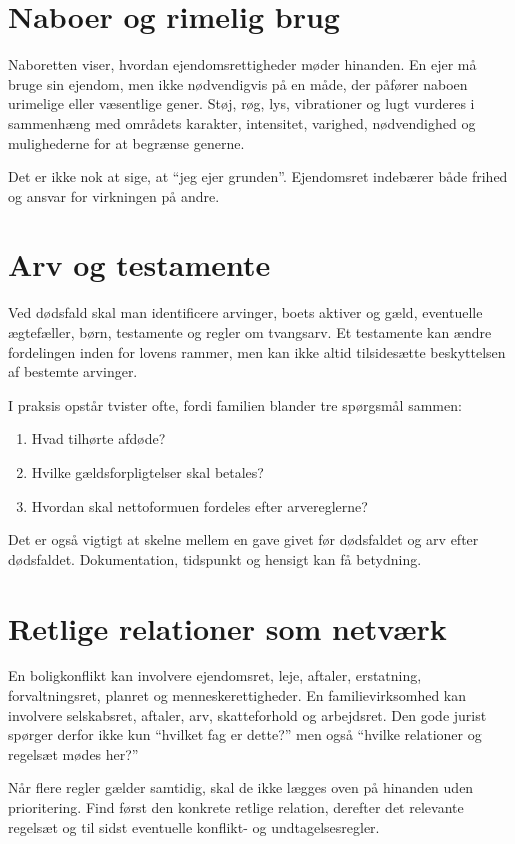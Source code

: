 \section{Naboer og rimelig brug}

Naboretten viser, hvordan ejendomsrettigheder møder hinanden. En ejer må bruge sin ejendom, men ikke nødvendigvis på en måde, der påfører naboen urimelige eller væsentlige gener. Støj, røg, lys, vibrationer og lugt vurderes i sammenhæng med områdets karakter, intensitet, varighed, nødvendighed og mulighederne for at begrænse generne.

Det er ikke nok at sige, at ``jeg ejer grunden''. Ejendomsret indebærer både frihed og ansvar for virkningen på andre.

\section{Arv og testamente}

Ved dødsfald skal man identificere arvinger, boets aktiver og gæld, eventuelle ægtefæller, børn, testamente og regler om tvangsarv. Et testamente kan ændre fordelingen inden for lovens rammer, men kan ikke altid tilsidesætte beskyttelsen af bestemte arvinger.

I praksis opstår tvister ofte, fordi familien blander tre spørgsmål sammen:
\begin{enumerate}
  \item Hvad tilhørte afdøde?
  \item Hvilke gældsforpligtelser skal betales?
  \item Hvordan skal nettoformuen fordeles efter arvereglerne?
\end{enumerate}

Det er også vigtigt at skelne mellem en gave givet før dødsfaldet og arv efter dødsfaldet. Dokumentation, tidspunkt og hensigt kan få betydning.

\section{Retlige relationer som netværk}

En boligkonflikt kan involvere ejendomsret, leje, aftaler, erstatning, forvaltningsret, planret og menneskerettigheder. En familievirksomhed kan involvere selskabsret, aftaler, arv, skatteforhold og arbejdsret. Den gode jurist spørger derfor ikke kun ``hvilket fag er dette?'' men også ``hvilke relationer og regelsæt mødes her?''

\begin{keybox}
Når flere regler gælder samtidig, skal de ikke lægges oven på hinanden uden prioritering. Find først den konkrete retlige relation, derefter det relevante regelsæt og til sidst eventuelle konflikt- og undtagelsesregler.
\end{keybox}


